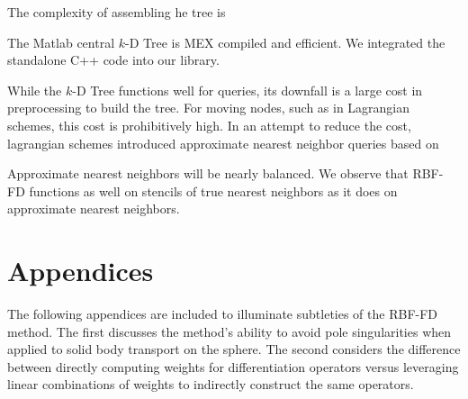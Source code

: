 \documentclass{report}
\begin{document}
{The complexity of assembling he tree is

The Matlab central $k$-D Tree is MEX compiled and efficient. We integrated the standalone C++ code into our library.  

While the $k$-D Tree functions well for queries, its downfall is a large cost in preprocessing to build the tree. For moving nodes, such as in Lagrangian schemes, this cost is prohibitively high. In an attempt to reduce the cost, lagrangian schemes introduced approximate nearest neighbor queries based on 

Approximate nearest neighbors will be nearly balanced. 
We observe that RBF-FD functions as well on stencils of true nearest neighbors as it does on approximate nearest neighbors. 

}

\part{Appendices}
The following appendices are included to illuminate subtleties of the RBF-FD method. The first discusses the method's ability to avoid pole singularities when applied to solid body transport on the sphere. The second considers the difference between directly computing weights for differentiation operators versus leveraging linear combinations of weights to indirectly construct the same operators. 
\appendix



\ifstandalone


\end{document}

